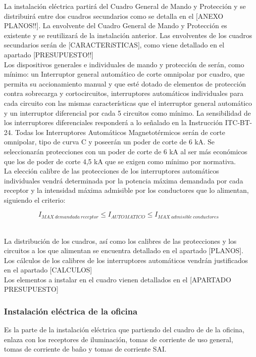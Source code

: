 La instalación eléctrica partirá del Cuadro General de Mando y Protección y se distribuirá entre dos cuadros secundarios como se detalla en el [ANEXO PLANOS!!]. La envolvente del Cuadro General de Mando y Protección es existente y se reutilizará de la instalación anterior. Las envolventes de los cuadros secundarios serán de [CARACTERíSTICAS], como viene detallado en el apartado [PRESUPUESTO!!]\\

Los dispositivos generales e individuales de mando y protección de serán, como mínimo: un Interruptor general automático de corte omnipolar por cuadro, que permita su accionamiento manual y que esté dotado de elementos de protección contra sobrecarga y cortocircuitos, interruptores automáticos individuales para cada circuito con las mismas características que el interruptor general automático y un interruptor diferencial por cada 5 circuitos como mínimo. La sensibilidad de los interruptores diferenciales responderá a lo señalado en la Instrucción ITC-BT-24. Todas los Interruptores Automáticos Magnetotérmicos serán de corte omnipolar, tipo de curva C y poseerán un poder de corte de 6 kA. Se seleccionarán protecciones con un poder de corte de 6 kA al ser más económicos que los de poder de corte 4,5 kA que se exigen como mínimo por normativa.\\

La elección calibre de las protecciones de los interruptores automáticos individuales vendrá determinada por la potencia máxima demandada por cada receptor y la intensidad máxima admisible por los conductores que lo alimentan, siguiendo el criterio:\

$$ I_{MAX\ demandada\ receptor}\leq I_{AUTOMATICO}\leq I_{MAX\ admisible\ conductores}$$\

La distribución de los cuadros, así como los calibres de las protecciones y los circuitos a los que alimentan se encuentra detallado en el apartado [PLANOS]. Los cálculos de los calibres de los interruptores automáticos vendrán justificados en el apartado [CALCULOS]\\

Los elementos a instalar en el cuadro vienen detallados en el [APARTADO PRESUPUESTO]\

\subsubsection{Instalación eléctrica de la oficina}

Es la parte de la instalación eléctrica que partiendo del cuadro de de la oficina, enlaza con los receptores de iluminación, tomas de corriente de uso general, tomas de corriente de baño y tomas de corriente SAI.\\

